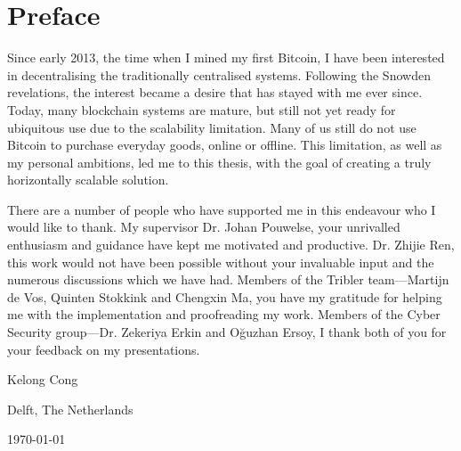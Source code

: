 \chapter*{Preface}
Since early 2013, the time when I mined my first Bitcoin, 
I have been interested in decentralising the traditionally centralised systems.
Following the Snowden revelations, the interest became a desire that has stayed with me ever since.
Today, many blockchain systems are mature, but still not yet ready for ubiquitous use due to the scalability limitation.
Many of us still do not use Bitcoin to purchase everyday goods, online or offline.
This limitation, as well as my personal ambitions, led me to this thesis,
with the goal of creating a truly horizontally scalable solution.

\vspace{1\baselineskip}

\noindent
There are a number of people who have supported me in this endeavour who I would like to thank.
My supervisor Dr. Johan Pouwelse, your unrivalled enthusiasm and guidance have kept me motivated and productive.
Dr. Zhijie Ren, this work would not have been possible without your invaluable input and the numerous discussions which we have had.
Members of the Tribler team---Martijn de Vos, Quinten Stokkink and Chengxin Ma,
you have my gratitude for helping me with the implementation and proofreading my work.
Members of the Cyber Security group---Dr. Zekeriya Erkin and O\u{g}uzhan Ersoy,
I thank both of you for your feedback on my presentations.

\vspace{1\baselineskip}

\noindent
Kelong Cong

\vspace{1\baselineskip}

\noindent
Delft, The Netherlands

\noindent
\today
